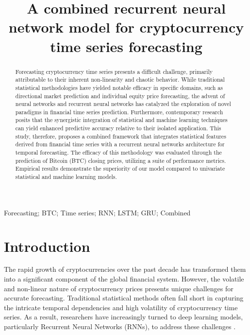 \documentclass[]{interact}
\theoremstyle{plain}%
\theoremstyle{definition}
\theoremstyle{remark}
\begin{document}
\articletype{}

\title{A combined recurrent neural network model for cryptocurrency time
series forecasting}


\author{
}


\maketitle

\begin{abstract}
Forecasting cryptocurrency time series presents a difficult challenge,
primarily attributable to their inherent non-linearity and chaotic
behavior. While traditional statistical methodologies have yielded
notable efficacy in specific domains, such as directional market
prediction and individual equity price forecasting, the advent of neural
networks and recurrent neural networks has catalyzed the exploration of
novel paradigms in financial time series prediction. Furthermore,
contemporary research posits that the synergistic integration of
statistical and machine learning techniques can yield enhanced
predictive accuracy relative to their isolated application. This study,
therefore, proposes a combined framework that integrates statistical
features derived from financial time series with a recurrent neural
networks architecture for temporal forecasting. The efficacy of this
methodology was evaluated through the prediction of Bitcoin (BTC)
closing prices, utilizing a suite of performance metrics. Empirical
results demonstrate the superiority of our model compared to univariate
statistical and machine learning models.
\end{abstract}

\begin{keywords}
Forecasting; BTC; Time series; RNN; LSTM; GRU; Combined
\end{keywords}

\section{Introduction}\label{introduction}

The rapid growth of cryptocurrencies over the past decade has
transformed them into a significant component of the global financial
system. However, the volatile and non-linear nature of cryptocurrency
prices presents unique challenges for accurate forecasting. Traditional
statistical methods often fall short in capturing the intricate temporal
dependencies and high volatility of cryptocurrency time series. As a
result, researchers have increasingly turned to deep learning models,
particularly Recurrent Neural Networks (RNNs), to address these
challenges \citep{NASIRTAFRESHI2022, kumar23, seable23} .
\end{document}
